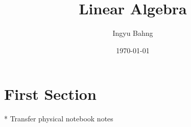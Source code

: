 \documentclass[10pt]{article}
\title{Linear Algebra}
\date{\today}
\author{Ingyu Bahng}
\begin{document}


\section{First Section}

* Transfer physical notebook notes
  
\end{document}
